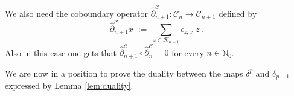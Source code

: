 \documentclass[a4paper,12pt,twoside,reqno]{amsart}
\theoremstyle{plain}
\theoremstyle{definition}
\theoremstyle{remark}
\numberwithin{equation}{section}
\numberwithin{figure}{section}
\numberwithin{table}{section}
\newcommand{\f}[1]{\mathcal{#1}}
\newcommand{\n}[1]{\mathbb{#1}}
\begin{document}
	
	
	
	\medskip
	
	
	We also need the coboundary operator $\widehat{\partial}^\f{C}_{n+1}:\f{C}_n\to \f{C}_{n+1}$ defined by 
	\begin{equation}\label{def:coboundary}
		\widehat{\partial}_{n+1}^\f{C} x\;:=\;\sum_{z\in \f{K}_{n+1}}\epsilon_{z,x}\;z\;.
	\end{equation}
	Also in this case one gets that $\widehat{\partial}_{n+1}^\f{C}\circ   \widehat{\partial}_{n}^\f{C}=0$ for every $n\in\n{N}_0$.
	
	
	
	
	
	
	\medskip
	
	
	
	
	We are now in a position to prove the duality between the maps $\delta^p$ and $\delta_{p+1}$
	expressed by Lemma \ref{lem:duality}.
\end{document}
